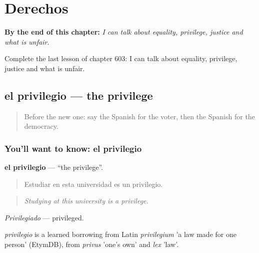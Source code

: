 
\chapter{Derechos}
\label{ch:es-derechos}

\begin{chapteropening}
\textbf{By the end of this chapter:} \emph{I can talk about equality, privilege, justice and what is unfair.}

Complete the last lesson of chapter 603: I can talk about equality, privilege, justice and what is unfair.
\end{chapteropening}

\section[el privilegio]{el privilegio — the privilege}

\label{lesson:ES-C603-privilegio}



\begin{quote}
Before the new one: say the Spanish for the voter, then the Spanish for the democracy.
\end{quote}

\subsection*{You'll want to know: el privilegio}
\textbf{el privilegio} — \textquotedblleft{}the privilege\textquotedblright{}.

\begin{quote}
Estudiar en esta universidad es un privilegio.
\end{quote}

\begin{quote}
\emph{Studying at this university is a privilege.}
\end{quote}

\emph{Privilegiado} — privileged.

\begin{cousinweb}
\emph{privilegio} is a learned borrowing from Latin \emph{privilegium} 'a law made for one person' (EtymDB), from \emph{privus} 'one's own' and \emph{lex} 'law'.
\end{cousinweb}

